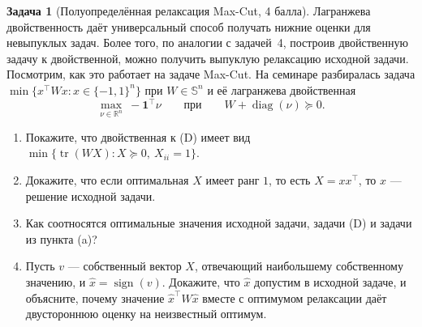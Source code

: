 \documentclass[11pt]{article}
\theoremstyle{definition}
\newtheorem{problem}{Задача}
\theoremstyle{starred}
\theoremstyle{definition}
\theoremstyle{remark}
\theoremstyle{plain}
\theoremstyle{definition}
\DeclareMathOperator{\tr}{tr}
\DeclareMathOperator{\diag}{diag}
\DeclareMathOperator{\sign}{sign}
\newcommand{\R}{\mathbb{R}}
\newcommand{\Sym}{\mathbb{S}}
\newcommand{\ones}{\mathbf{1}}
\begin{document}
\begin{problem}[Полуопределённая релаксация Max-Cut, 4 балла]
Лагранжева двойственность даёт универсальный способ получать нижние оценки для невыпуклых задач.
Более того, по аналогии с задачей~4, построив двойственную задачу к двойственной, можно получить
выпуклую релаксацию исходной задачи. Посмотрим, как это работает на задаче Max-Cut. На семинаре разбиралась задача $\min\{x^{\top} W x : x \in \{-1,1\}^{n}\}$ при $W \in \Sym^{n}$ и
её лагранжева двойственная
\[
\max_{\nu \in \R^{n}} \ -\ones^{\top}\nu
\qquad\text{при}\qquad W + \diag(\nu) \succeq 0 .
\tag{D}
\]
\begin{enumerate}[label=(\alph*), nosep]
  \item Покажите, что двойственная к (D) имеет вид
        $\min\{\tr(WX) : X \succeq 0,\ X_{ii} = 1\}$.
  \item Докажите, что если оптимальная $X$ имеет ранг $1$, то есть $X = xx^{\top}$, то $x$ --- 
        решение исходной задачи.
  \item Как соотносятся оптимальные значения исходной задачи, задачи (D) и задачи из пункта (a)?
  \item Пусть $v$ --- собственный вектор $X$, отвечающий наибольшему собственному значению, и
        $\hat x = \sign(v)$. Докажите, что $\hat x$ допустим в исходной задаче, и объясните, почему
        значение $\hat x^{\top} W \hat x$ вместе с оптимумом релаксации даёт двустороннюю оценку на
        неизвестный оптимум.
\end{enumerate}
\end{problem}
\end{document}
